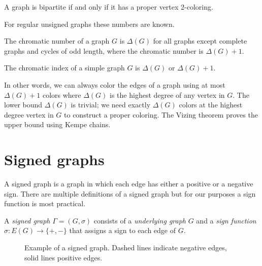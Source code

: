 \begin{theorem}\label{th:bipartite}
    A graph is bipartite if and only if it has a proper vertex 2-coloring.
\end{theorem}

For regular unsigned graphs these numbers are known.

\begin{theorem}
    The chromatic number of a graph $G$ is $\Delta(G)$ for all graphs except complete graphs and cycles of odd length, where the chromatic number is $\Delta(G) + 1$.
\end{theorem}

\begin{theorem}[Vizing]
    The chromatic index of a simple graph $G$ is $\Delta(G)$ or $\Delta(G) + 1$.
\end{theorem}

In other words, we can always color the edges of a graph using at most $\Delta(G) + 1$ colors where $\Delta(G)$ is the highest degree of any vertex in $G$. The lower bound $\Delta(G)$ is trivial; we need exactly $\Delta(G)$ colors at the highest degree vertex in $G$ to construct a proper coloring. The Vizing theorem proves the upper bound using Kempe chains.

\section{Signed graphs}

A signed graph is a graph in which each edge has either a positive or a negative sign. There are multiple definitions of a signed graph but for our purposes a sign function is most practical.

\begin{definition}
    A \textit{signed graph} $\Gamma = (G, \sigma)$ consists of a \textit{underlying graph} $G$ and a \textit{sign function} $\sigma : E(G) \rightarrow \{+,-\}$ that assigns a sign to each edge of $G$.
\end{definition}

\begin{figure}[h]
    \centering
    \caption[Example of a signed graph]{Example of a signed graph. Dashed lines indicate negative edges, solid lines positive edges.}
\end{figure}

